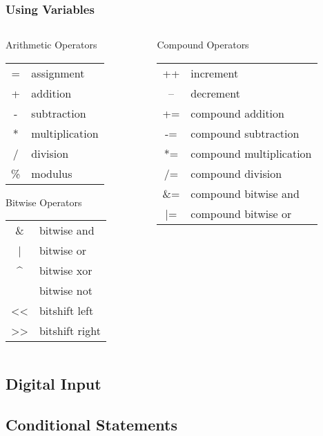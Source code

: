 \begin{frame}
	\frametitle{Using Variables}
	\begin{columns}[T]
		\begin{column}{0.5\textwidth}
			Arithmetic Operators
			\begin{tabular}{c|l}
				= & assignment\\
				+ & addition\\
				- & subtraction\\
				* & multiplication\\
				/ & division\\
				\% & modulus\\
			\end{tabular}
			
			Bitwise Operators
			\begin{tabular}{c|l}
				\& & bitwise and\\
				| & bitwise or\\
				\^{} & bitwise xor\\
				~ & bitwise not\\
				<< & bitshift left\\
				>> & bitshift right\\
			\end{tabular}
		\end{column}
		\begin{column}{0.5\textwidth}
			Compound Operators
			\begin{tabular}{c|l}
				++ & increment\\
				-- & decrement\\
				+= & compound addition\\
				-= & compound subtraction\\
				*= & compound multiplication\\
				/= & compound division\\
				\&= & compound bitwise and\\
				|= & compound bitwise or\\
			\end{tabular}
		\end{column}
	\end{columns}
\end{frame}

\subsection{Digital Input}
\label{sub:digital_input}


\subsection{Conditional Statements}
\label{sub:conditional_statements}
